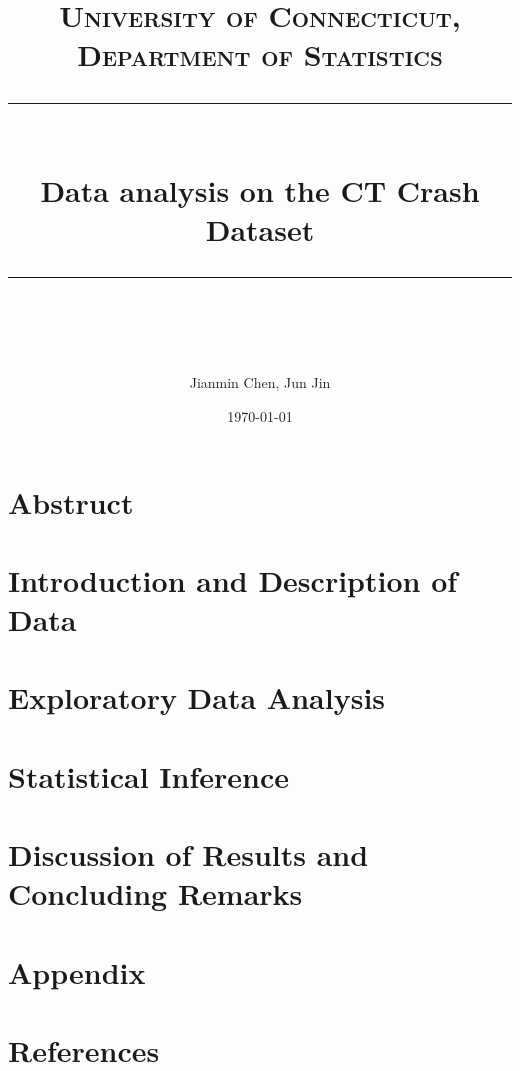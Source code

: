 \documentclass[11pt]{scrartcl} %
\title{	
	\normalfont\normalsize
	\textsc{University of Connecticut, Department of Statistics}\\ %
	\vspace{25pt} %
	\rule{\linewidth}{0.5pt}\\ %
	\vspace{20pt} %
	{\huge Data analysis on the CT Crash Dataset}\\ %
	\vspace{12pt} %
	\rule{\linewidth}{2pt}\\ %
	\vspace{12pt} %
}
\author{\LARGE Jianmin Chen, Jun Jin} %
\date{\normalsize\today} %
\begin{document}
\maketitle %


\section{Abstruct}

\section{Introduction and Description of Data}


\section{Exploratory Data Analysis}

\section{Statistical Inference}

\section{ Discussion of Results and Concluding Remarks}

\section{ Appendix}

\section{References}



\end{document}
